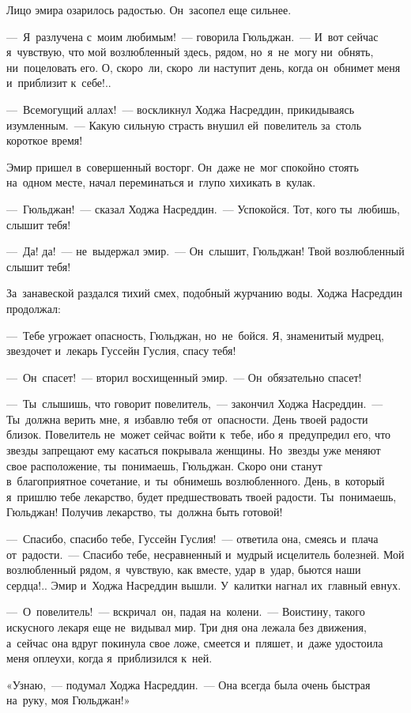 \documentclass[12pt,a4paper]{book}
\begin{document}
Лицо эмира озарилось радостью. Он~засопел еще сильнее.

—~Я~разлучена с~моим любимым!~— говорила Гюльджан.~— И~вот сейчас я~чувствую, что мой возлюбленный здесь, рядом, но~я~не~могу ни~обнять, ни~поцеловать его. О, скоро~ли, скоро~ли наступит день, когда он~обнимет меня и~приблизит к~себе!..

—~Всемогущий аллах!~— воскликнул Ходжа Насреддин, прикидываясь изумленным.~— Какую сильную страсть внушил ей~повелитель за~столь короткое время!

Эмир пришел в~совершенный восторг. Он~даже не~мог спокойно стоять на~одном месте, начал переминаться и~глупо хихикать в~кулак.

—~Гюльджан!~— сказал Ходжа Насреддин.~— Успокойся. Тот, кого ты~любишь, слышит тебя!

—~Да! да!~— не~выдержал эмир.~— Он~слышит, Гюльджан! Твой возлюбленный слышит тебя!

За~занавеской раздался тихий смех, подобный журчанию воды. Ходжа Насреддин продолжал:

—~Тебе угрожает опасность, Гюльджан, но~не~бойся. Я, знаменитый мудрец, звездочет и~лекарь Гуссейн Гуслия, спасу тебя!

—~Он~спасет!~— вторил восхищенный эмир.~— Он~обязательно спасет!

—~Ты~слышишь, что говорит повелитель,~— закончил Ходжа Насреддин.~— Ты~должна верить мне, я~избавлю тебя от~опасности. День твоей радости близок. Повелитель не~может сейчас войти к~тебе, ибо я~предупредил его, что звезды запрещают ему касаться покрывала женщины. Но~звезды уже меняют свое расположение, ты~понимаешь, Гюльджан. Скоро они станут в~благоприятное сочетание, и~ты~обнимешь возлюбленного. День, в~который я~пришлю тебе лекарство, будет предшествовать твоей радости. Ты~понимаешь, Гюльджан! Получив лекарство, ты~должна быть готовой!

—~Спасибо, спасибо тебе, Гуссейн Гуслия!~— ответила она, смеясь и~плача от~радости.~— Спасибо тебе, несравненный и~мудрый исцелитель болезней. Мой возлюбленный рядом, я~чувствую, как вместе, удар в~удар, бьются наши сердца!.. Эмир и~Ходжа Насреддин вышли. У~калитки нагнал их~главный евнух.

—~О~повелитель!~— вскричал~он, падая на~колени.~— Воистину, такого искусного лекаря еще не~видывал мир. Три дня она лежала без движения, а~сейчас она вдруг покинула свое ложе, смеется и~пляшет, и~даже удостоила меня оплеухи, когда я~приблизился к~ней.

«Узнаю,~— подумал Ходжа Насреддин.~— Она всегда была очень быстрая на~руку, моя Гюльджан!»
\end{document}

